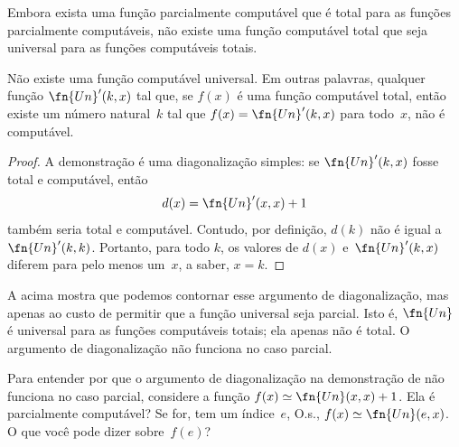\documentclass[../../../include/open-logic-section]{subfiles}
\begin{document}

Embora exista uma função parcialmente computável que é total para as
funções parcialmente computáveis, não existe uma função computável
total que seja universal para as funções computáveis totais.

\begin{thm}
Não existe uma função computável universal. Em outras palavras,
qualquer função $\fn{Un}'(k, x)$ tal que, se $f(x)$ é uma função
computável total, então existe um número natural~$k$ tal que
$f(x) = \fn{Un}'(k,x)$ para todo~$x$, não é computável.
\end{thm}

\begin{proof}
A demonstração é uma diagonalização simples: se $\fn{Un}'(k,x)$ fosse
total e computável, então
\[
d(x) = \fn{Un}'(x, x) + 1
\]
também seria total e computável. Contudo, por definição, $d(k)$ não é
igual a $\fn{Un}'(k,k)$. Portanto, para todo $k$, os valores de
$d(x)$ e~$\fn{Un}'(k, x)$ diferem para pelo menos um~$x$, a saber,
$x = k$.
\end{proof}

\begin{explain}
A  acima mostra que podemos contornar esse
argumento de diagonalização, mas apenas ao custo de permitir que a
função universal seja parcial. Isto é, $\fn{Un}$ é universal para as
funções computáveis totais; ela apenas não é total. O argumento de
diagonalização não funciona no caso parcial.
\end{explain}

\begin{prob}
  Para entender por que o argumento de diagonalização na demonstração
  de  não funciona no caso parcial, considere a
  função $f(x) \simeq \fn{Un}(x,x)+1$. Ela é parcialmente computável?
  Se for, tem um índice~$e$, O.s.\@,
  $f(x) \simeq \fn{Un}(e,x)$. O que você pode dizer sobre~$f(e)$?
\end{prob}
\end{document}
